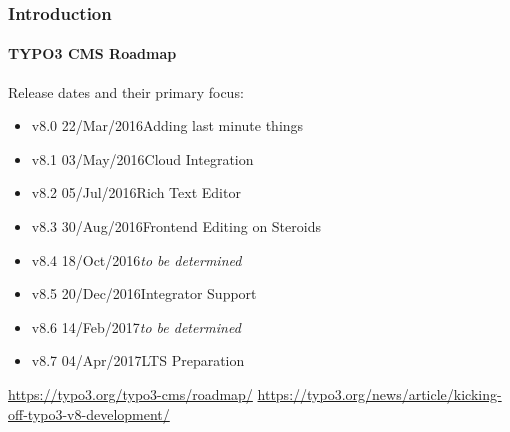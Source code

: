 \begin{frame}[fragile]
	\frametitle{Introduction}
	\framesubtitle{TYPO3 CMS Roadmap}

	Release dates and their primary focus:

	\begin{itemize}

		\item v8.0 \tabto{1.1cm}22/Mar/2016\tabto{3.4cm}Adding last minute things
		\item
			\begingroup
				\color{typo3orange}
					v8.1 \tabto{1.1cm}03/May/2016\tabto{3.4cm}Cloud Integration
			\endgroup
		\item v8.2 \tabto{1.1cm}05/Jul/2016\tabto{3.4cm}Rich Text Editor
		\item v8.3 \tabto{1.1cm}30/Aug/2016\tabto{3.4cm}Frontend Editing on Steroids
		\item v8.4 \tabto{1.1cm}18/Oct/2016\tabto{3.4cm}\textit{to be determined}
		\item v8.5 \tabto{1.1cm}20/Dec/2016\tabto{3.4cm}Integrator Support
		\item v8.6 \tabto{1.1cm}14/Feb/2017\tabto{3.4cm}\textit{to be determined}
		\item v8.7 \tabto{1.1cm}04/Apr/2017\tabto{3.4cm}LTS Preparation

	\end{itemize}

	\smaller
		\url{https://typo3.org/typo3-cms/roadmap/}\newline
		\url{https://typo3.org/news/article/kicking-off-typo3-v8-development/}
	\normalsize

\end{frame}

